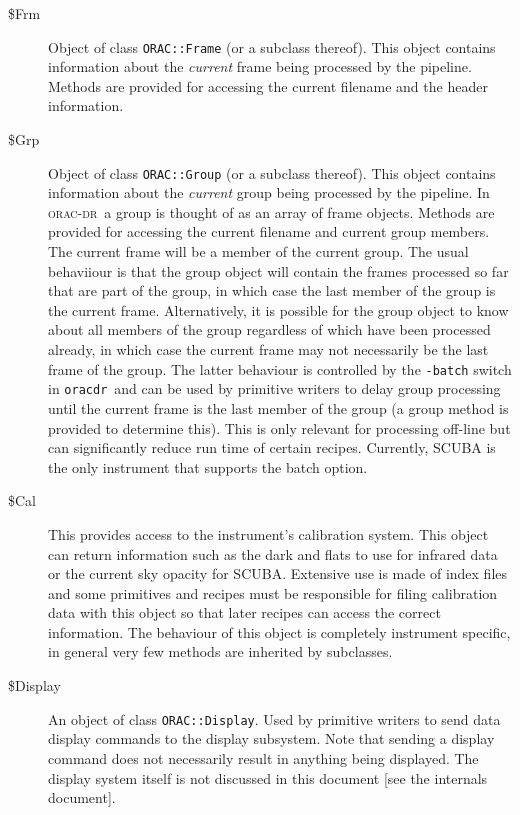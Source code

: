 \documentclass[twoside,11pt]{article}
\renewcommand{\_}{\texttt{\symbol{95}}}
\newcommand{\Oracdr}{\textsc{orac-dr}}
\newcommand{\oracdr}{\texttt{oracdr}}
\begin{document}
\begin{description}
\item[\$Frm] \mbox{} %

  Object of class \texttt{ORAC::Frame} (or a subclass thereof). This
object contains information about the \emph{current} frame being
processed by the pipeline. Methods are provided for accessing the
current filename and the header information.

\item[\$Grp] \mbox{} %

Object of class \texttt{ORAC::Group} (or a subclass thereof). This
object contains information about the \emph{current} group being
processed by the pipeline. In \Oracdr\ a group is thought of as an
array of frame objects. Methods are provided for accessing the current
filename and current group members. The current frame will be a member
of the current group. The usual behaviiour is that the group object
will contain the frames processed so far that are part of the group,
in which case the last member of the group is the current frame.
Alternatively, it is possible for the group object to know about all
members of the group regardless of which have been processed already,
in which case the current frame may not necessarily be the last frame of
the group. The latter behaviour is controlled by the \texttt{-batch}
switch in \oracdr\ and can be used by primitive writers to delay group 
processing until the current frame is the last member of the group (a
group method is provided to determine this). This is only relevant for 
processing off-line but can significantly reduce run time of certain
recipes. Currently, SCUBA is the
only instrument that supports the batch option.

\item[\$Cal] \mbox{} %

This provides access to the instrument's calibration system. This object
can return information such as the dark and flats to use for infrared
data or the current sky opacity for SCUBA. Extensive use is made of
index files and some primitives and recipes  must be responsible
for filing calibration data with this object so that later recipes
can access the correct information. The behaviour of this object is 
completely instrument specific, in general very few methods are
inherited by subclasses.

\item[\$Display] \mbox{} %

An object of class \texttt{ORAC::Display}. Used by primitive writers
to send data display commands to the display subsystem. Note that
sending a display command does not necessarily result in anything
being displayed. The display system itself is not discussed in this document
[see the internals document].


\end{description}
\end{document}
